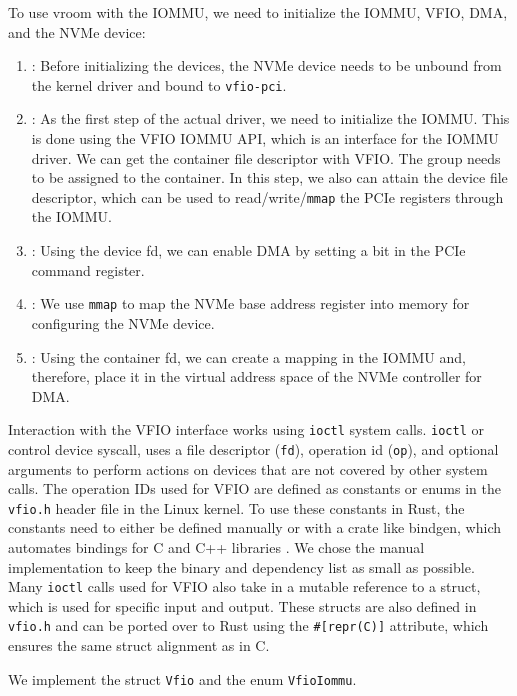 To use vroom with the IOMMU, we need to initialize the IOMMU, VFIO, DMA, and the NVMe device:
\begin{enumerate}
    \item \textbf{}: Before initializing the devices, the NVMe device needs to be unbound from the kernel driver and bound to \texttt{vfio-pci}.
    \item \textbf{}: As the first step of the actual driver, we need to initialize the IOMMU. This is done using the VFIO IOMMU API, which is an interface for the IOMMU driver. We can get the container file descriptor with VFIO. The group needs to be assigned to the container. In this step, we also can attain the device file descriptor, which can be used to read/write/\texttt{mmap} the PCIe registers through the IOMMU.
    \item \textbf{}: Using the device fd, we can enable DMA by setting a bit in the PCIe command register.
    \item \textbf{}: We use \texttt{mmap} to map the NVMe base address register into memory for configuring the NVMe device.
    \item \textbf{}: Using the container fd, we can create a mapping in the IOMMU and, therefore, place it in the virtual address space of the NVMe controller for DMA.
\end{enumerate}

Interaction with the VFIO interface works using \texttt{ioctl} system calls.
\texttt{ioctl} or control device syscall, uses a file descriptor (\texttt{fd}), operation id (\texttt{op}), and optional arguments to perform actions on devices that are not covered by other system calls.
The operation IDs used for VFIO are defined as constants or enums in the \texttt{vfio.h} header file in the Linux kernel. To use these constants in Rust, the constants need to either be defined manually or with a crate like bindgen, which automates bindings for C and C++ libraries \cite{cratebindgen}. We chose the manual implementation to keep the binary and dependency list as small as possible.
Many \texttt{ioctl} calls used for VFIO also take in a mutable reference to a struct, which is used for specific input and output. These structs are also defined in \texttt{vfio.h} and can be ported over to Rust using the \texttt{\#[repr(C)]} attribute, which ensures the same struct alignment as in C.

We implement the struct \texttt{Vfio} and the enum \texttt{VfioIommu}.

